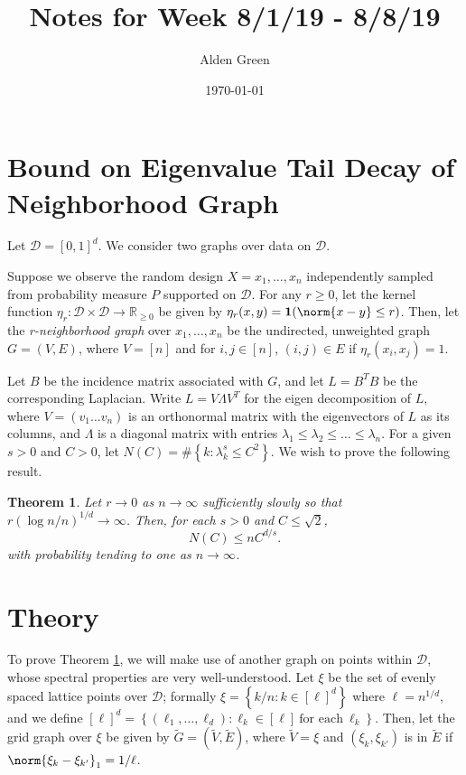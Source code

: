 \documentclass{article}
\newcommand{\Reals}{\mathbb{R}}
\newcommand{\set}[1]{\left\{#1\right\}}
\newcommand{\1}{\mathbf{1}}
\newcommand{\wt}[1]{\widetilde{#1}}
\theoremstyle{alden}
\theoremstyle{aldenthm}
\newtheorem{theorem}{Theorem}
\theoremstyle{definition}
\theoremstyle{remark}
\begin{document}
\title{Notes for Week 8/1/19 - 8/8/19}
\author{Alden Green}
\date{\today}
\maketitle

\section{Bound on Eigenvalue Tail Decay of Neighborhood Graph}
Let $\mathcal{D} = [0,1]^d$. We consider two graphs over data on $\mathcal{D}$.

Suppose we observe the random design $X = x_1, \ldots, x_n$ independently sampled from probability measure $P$ supported on $\mathcal{D}$. For any $r \geq 0$, let the kernel function $\eta_r: \mathcal{D} \times \mathcal{D} \to \Reals_{\geq 0}$ be given by $\eta_r(x,y) = \1(\norm{x - y} \leq r)$. Then, let the \emph{r-neighborhood graph} over $x_1,\ldots,x_n$ be the undirected, unweighted graph $G = (V,E)$, where $V = [n]$ and for $i,j \in [n]$, $(i,j) \in E$ if $\eta_r(x_i, x_j) = 1$. 

Let $B$ be the incidence matrix associated with $G$, and let $L = B^TB$ be the corresponding Laplacian. Write $L = V \Lambda V^T$ for the eigen decomposition of $L$, where $V = (v_1 \ldots v_n)$ is an orthonormal matrix with the eigenvectors of $L$ as its columns, and $\Lambda$ is a diagonal matrix with entries $\lambda_1 \leq \lambda_2 \leq \ldots \leq \lambda_n$. For a given $s > 0$ and $C > 0$, let $N(C) = \#\set{k: \lambda_k^s \leq C^2}$. We wish to prove the following result.

\begin{theorem}
	\label{thm:spectral_decay}
	Let $r \to 0$ as $n \to \infty$ sufficiently slowly so that $r(\log n/n)^{1/d} \to \infty$. Then, for each $s > 0$ and $C \leq \sqrt{2}$,
	\begin{equation}
	\label{eqn:spectral_decay}
	N(C) \leq n C^{d/s}.
	\end{equation} 
	with probability tending to one as $n \to \infty$. 
\end{theorem}

\section{Theory}
To prove Theorem \ref{thm:spectral_decay}, we will make use of another graph on points within $\mathcal{D}$, whose spectral properties are very well-understood. Let $\xi$ be the set of evenly spaced lattice points over $\mathcal{D}$; formally $\xi = \set{k/n: k \in [\ell]^d}$ where $\ell = n^{1/d}$, and we define $[\ell]^d = \set{(\ell_1,\ldots,\ell_d): \ell_k \in [\ell] ~\textrm{for each}~ \ell_k}$. Then, let the grid graph over $\xi$ be given by $\wt{G} = (\wt{V},\wt{E})$, where $\wt{V} = \xi$ and $(\xi_k, \xi_{k'})$ is in $\wt{E}$ if $\norm{\xi_k - \xi_{k'}}_1 = 1/\ell$.  
\end{document}
